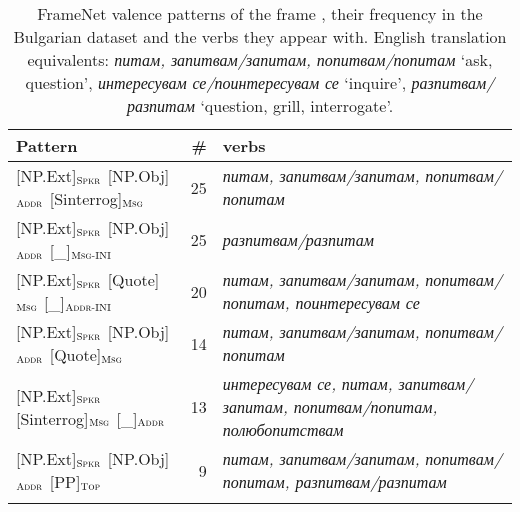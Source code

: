 \documentclass[output=paper,colorlinks,citecolor=brown]{langscibook}
\begin{document}
\begin{table}
    \centering\footnotesize
    \begin{tabularx}{\textwidth}{ lrQ }
\lsptoprule
         Pattern  & \#  & verbs \\
\midrule
{[NP.Ext]}$_{\text{\textsc{Spkr}}}$ {[NP.Obj]}$_{\text{\textsc{Addr}}}$ {[Sinterrog]}$_{\text{\textsc{Msg}}}$ & 25 & \textit{питам, запитвам\slash запитам, попитвам\slash попитам}\\

{[NP.Ext]}$_{\text{\textsc{Spkr}}}$ {[NP.Obj]}$_{\text{\textsc{Addr}}}$ {[\_]}$_{\text{\textsc{Msg-INI}}}$ & 25 & \textit{разпитвам\slash разпитам}\\

{[NP.Ext]}$_{\text{\textsc{Spkr}}}$ {[Quote]}$_{\text{\textsc{Msg}}}$ {[\_]}$_{\text{\textsc{Addr-INI}}}$ & 20 & \textit{питам, запитвам\slash запитам, попитвам\slash попитам, поинтересувам се}\\

{[NP.Ext]}$_{\text{\textsc{Spkr}}}$ {[NP.Obj]}$_{\text{\textsc{Addr}}}$ {[Quote]}$_{\text{\textsc{Msg}}}$ & 14 & \textit{питам, запитвам\slash запитам, попитвам\slash попитам}\\

{[NP.Ext]}$_{\text{\textsc{Spkr}}}$ {[Sinterrog]}$_{\text{\textsc{Msg}}}$ {[\_]}$_{\text{\textsc{Addr}}}$ & 13 & \textit{интересувам се, питам, запитвам\slash запитам, попитвам\slash попитам, полюбопитствам}\\


{[NP.Ext]}$_{\text{\textsc{Spkr}}}$ {[NP.Obj]}$_{\text{\textsc{Addr}}}$ {[PP]}$_{\text{\textsc{Top}}}$ & 9 & \textit{питам, запитвам\slash запитам, попитвам\slash попитам, разпитвам\slash разпитам}\\



\lspbottomrule
    \end{tabularx}
    \caption{FrameNet valence patterns of the frame , their frequency in the Bulgarian dataset and the verbs they appear with.
    English translation equivalents: \textit{питам, запитвам\slash запитам, попитвам\slash попитам} `ask, question', \textit{интересувам се\slash поинтересувам се} `inquire', \textit{разпитвам\slash разпитам} `question, grill, interrogate'.}
    \label{tbl:questioning-valence-bg}
\end{table} 
\end{document}
